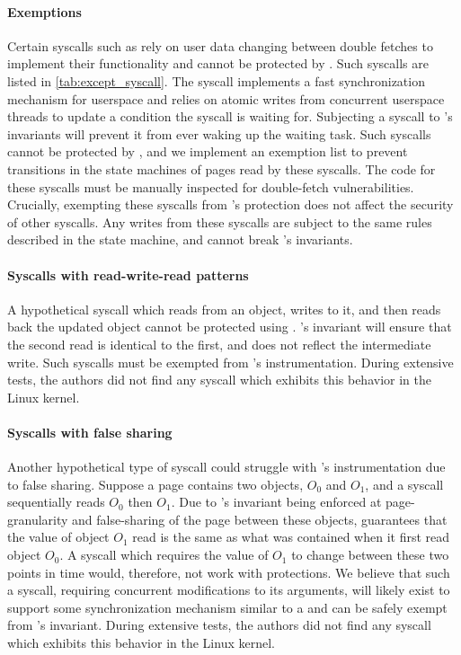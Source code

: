 \documentclass[letterpaper,twocolumn,10pt, anonymous]{article}
\begin{document}
\paragraph{Exemptions}
Certain syscalls such as  rely on user data changing between 
double fetches to implement their functionality and cannot be protected by
\tiktok.
Such syscalls are listed in \autoref{tab:except_syscall}.
The  syscall implements a fast synchronization mechanism
for userspace and relies on atomic writes from concurrent userspace
threads to update a condition the syscall is waiting for. 
Subjecting a  syscall to \tiktok's invariants will prevent
it from ever waking up the waiting task.
Such syscalls cannot be protected by \tiktok, and we implement an 
exemption list to prevent transitions in the state machines of pages read 
by these syscalls.
The code for these syscalls must be manually inspected for double-fetch 
vulnerabilities.
Crucially, exempting these syscalls from \tiktok's protection does not 
affect the security of other syscalls. 
Any writes from these syscalls are subject to the same rules described
in the state machine, and cannot break \tiktok's invariants.


\paragraph{Syscalls with read-write-read patterns}
A hypothetical syscall which reads from an object, writes to it, and
then reads back the updated object cannot be protected using \tiktok.
\tiktok's invariant will ensure that the second read is identical to the first,
and does not reflect the intermediate write.
Such syscalls must be exempted from \tiktok's instrumentation.
During extensive tests, the authors did not find any syscall which exhibits this behavior in the Linux
kernel. 

\paragraph{Syscalls with false sharing}
Another hypothetical type of syscall could struggle with \tiktok's 
instrumentation due to false sharing.
Suppose a page contains two objects, $O_0$ and $O_1$, and a syscall  
sequentially reads $O_0$ then $O_1$.
Due to \tiktok's invariant being enforced at page-granularity and 
false-sharing of the page between these objects, \tiktok guarantees that
the value of object $O_1$ read is the same as what was contained when it 
first read object $O_0$. 
A syscall which requires the value of $O_1$ to change between these two 
points in time would, therefore, not work with \tiktok protections. 
We believe that such a syscall, requiring concurrent modifications to its 
arguments, will likely exist to support some synchronization mechanism 
similar to a  and can be safely exempt from \tiktok's invariant.
%
During extensive tests, the authors did not find any syscall which exhibits this behavior in the 
Linux kernel. 
\end{document}
